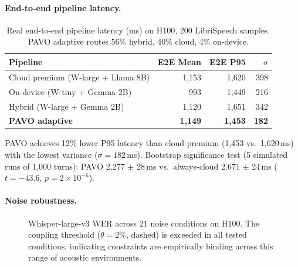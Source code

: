\documentclass{article}
\begin{document}
\paragraph{End-to-end pipeline latency.}

\begin{table}[t]
\centering
\caption{Real end-to-end pipeline latency (ms) on H100, 200 LibriSpeech samples. PAVO adaptive routes 56\% hybrid, 40\% cloud, 4\% on-device.}
\label{tab:e2e}
\small
\begin{tabular}{lrrr}
\toprule
Pipeline & E2E Mean & E2E P95 & $\sigma$ \\
\midrule
Cloud premium (W-large + Llama 8B) & 1{,}153 & 1{,}620 & 398 \\
On-device (W-tiny + Gemma 2B)      & 993    & 1{,}449 & 216 \\
Hybrid (W-large + Gemma 2B)        & 1{,}120 & 1{,}651 & 342 \\
\textbf{PAVO adaptive}             & \textbf{1{,}149} & \textbf{1{,}453} & \textbf{182} \\
\bottomrule
\end{tabular}
\end{table}

PAVO achieves 12\% lower P95 latency than cloud premium (1{,}453 vs.\ 1{,}620\,ms) with the lowest variance ($\sigma=182$\,ms). Bootstrap significance test (5 simulated runs of 1{,}000 turns): PAVO 2{,}277 $\pm$ 28\,ms vs.\ always-cloud 2{,}671 $\pm$ 24\,ms ($t = -43.6$, $p = 2\times10^{-6}$).

\paragraph{Noise robustness.}

\begin{figure}[t]
\centering
{}
\caption{Whisper-large-v3 WER across 21 noise conditions on H100. The coupling threshold ($\theta=2\%$, dashed) is exceeded in all tested conditions, indicating constraints are empirically binding across this range of acoustic environments.}
\label{fig:noise_robustness}
\end{figure}
\end{document}
